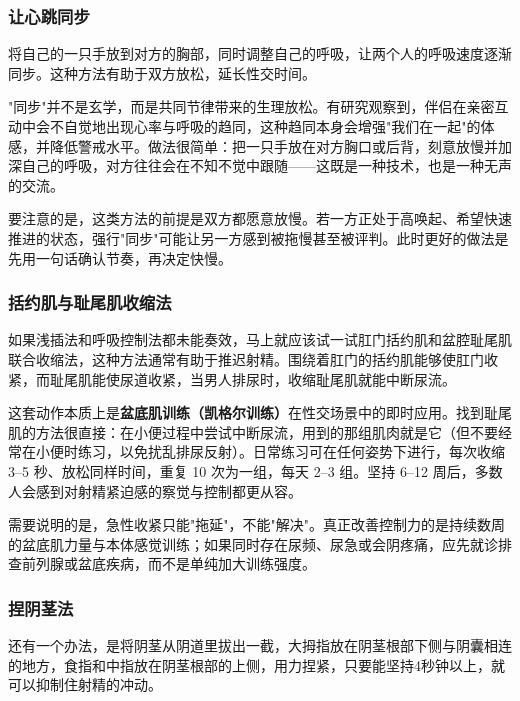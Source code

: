 \documentclass[12pt,UTF8]{ctexbook}
\begin{document}
\subsubsection{让心跳同步}

将自己的一只手放到对方的胸部，同时调整自己的呼吸，让两个人的呼吸速度逐渐同步。这种方法有助于双方放松，延长性交时间。

\vspace{0.5em}

"同步"并不是玄学，而是共同节律带来的生理放松。有研究观察到，伴侣在亲密互动中会不自觉地出现心率与呼吸的趋同，这种趋同本身会增强"我们在一起"的体感，并降低警戒水平。做法很简单：把一只手放在对方胸口或后背，刻意放慢并加深自己的呼吸，对方往往会在不知不觉中跟随——这既是一种技术，也是一种无声的交流。

要注意的是，这类方法的前提是双方都愿意放慢。若一方正处于高唤起、希望快速推进的状态，强行"同步"可能让另一方感到被拖慢甚至被评判。此时更好的做法是先用一句话确认节奏，再决定快慢。

\subsubsection{括约肌与耻尾肌收缩法}

如果浅插法和呼吸控制法都未能奏效，马上就应该试一试肛门括约肌和盆腔耻尾肌联合收缩法，这种方法通常有助于推迟射精。围绕着肛门的括约肌能够使肛门收紧，而耻尾肌能使尿道收紧，当男人排尿时，收缩耻尾肌就能中断尿流。

\vspace{0.5em}

这套动作本质上是\textbf{盆底肌训练（凯格尔训练）}在性交场景中的即时应用。找到耻尾肌的方法很直接：在小便过程中尝试中断尿流，用到的那组肌肉就是它（但不要经常在小便时练习，以免扰乱排尿反射）。日常练习可在任何姿势下进行，每次收缩 3--5 秒、放松同样时间，重复 10 次为一组，每天 2--3 组。坚持 6--12 周后，多数人会感到对射精紧迫感的察觉与控制都更从容。

需要说明的是，急性收紧只能"拖延"，不能"解决"。真正改善控制力的是持续数周的盆底肌力量与本体感觉训练；如果同时存在尿频、尿急或会阴疼痛，应先就诊排查前列腺或盆底疾病，而不是单纯加大训练强度。

\subsubsection{捏阴茎法}

还有一个办法，是将阴茎从阴道里拔出一截，大拇指放在阴茎根部下侧与阴囊相连的地方，食指和中指放在阴茎根部的上侧，用力捏紧，只要能坚持4秒钟以上，就可以抑制住射精的冲动。
\end{document}

